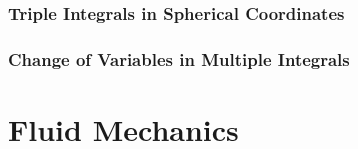 \documentclass[11pt]{report}
\begin{document}
\begin{example}
    
    
\end{example}
\subsection{Triple Integrals in Spherical Coordinates}
\subsection{Change of Variables in Multiple Integrals} \label{sec:change_of_variables}
\chapter{Fluid Mechanics}
\end{document}
